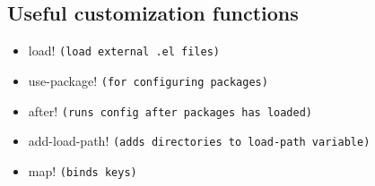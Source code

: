 \documentclass{assignments}
\begin{document}
\subsection*{Useful customization functions}
\label{sec:orgb0e216e}
\begin{itemize}
\item load! \texttt{(load external .el files)}
\item use-package! \texttt{(for configuring packages)}
\item after! \texttt{(runs config after packages has loaded)}
\item add-load-path! \texttt{(adds directories to load-path variable)}
\item map! \texttt{(binds keys)}
\end{itemize}
\end{document}
